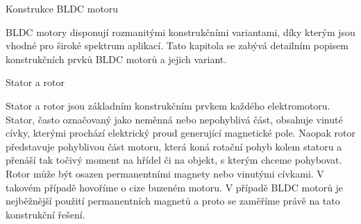 
%
%

\chap Konstrukce BLDC motoru

BLDC motory disponují rozmanitými konstrukčními variantami, díky kterým jsou vhodné pro široké spektrum aplikací.
Tato kapitola se zabývá detailním popisem konstrukčních prvků BLDC motorů a jejich variant.


\sec Stator a rotor

Stator a rotor jsou základním konstrukčním prvkem každého elektromotoru. Stator, často označovaný jako neměnná nebo nepohyblivá část, obsahuje vinuté cívky, kterými prochází elektrický
 proud generující magnetické pole. Naopak rotor představuje pohyblivou část motoru, která koná rotační pohyb kolem statoru a přenáší tak točivý moment na hřídel či na objekt, s kterým chceme pohybovat. 
 Rotor může být osazen permanentními magnety nebo vinutými cívkami. V takovém případě hovoříme o cize buzeném motoru. V případě BLDC motorů je nejběžnější použití permanentních magnetů a proto se 
 zaměříme právě na tato konstrukční řešení. %

